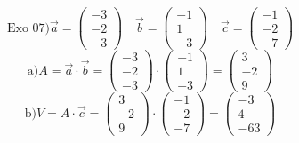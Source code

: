 \documentclass{article}
\begin{document}
\[ \text{Exo 07)} \vec{a} = \begin{pmatrix} -3 \\ -2 \\ -3 \end{pmatrix} \quad \vec{b} = \begin{pmatrix} -1 \\ 1 \\ -3 \end{pmatrix} \quad \vec{c} = \begin{pmatrix} -1 \\ -2 \\ -7 \end{pmatrix} \]
\[ \text{a)} A = \vec{a} \cdot \vec{b} = \begin{pmatrix} -3 \\ -2 \\ -3 \end{pmatrix} \cdot \begin{pmatrix} -1 \\ 1 \\ -3 \end{pmatrix} = \begin{pmatrix} 3 \\ -2 \\ 9 \end{pmatrix} \]
\[ \text{b)} V = A \cdot \vec{c} = \begin{pmatrix} 3 \\ -2 \\ 9 \end{pmatrix} \cdot \begin{pmatrix} -1 \\ -2 \\ -7 \end{pmatrix} = \begin{pmatrix} -3 \\ 4 \\ -63 \end{pmatrix} \]
\end{document}
